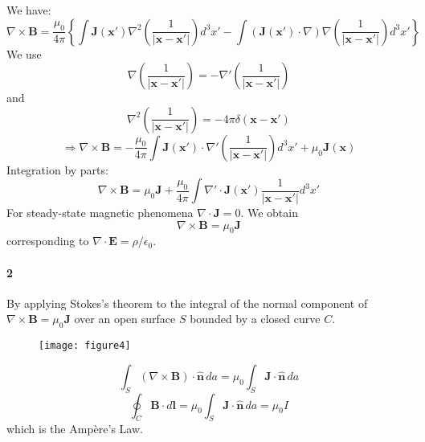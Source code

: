 \documentclass{article}
\begin{document}
	We have:
	\begin{equation*}
		\nabla \times \mathbf{B} = \frac{\mu_0}{4\pi} \left\{ \int \mathbf{J}(\mathbf{x'}) \nabla^2 \left(\frac{1}{|\mathbf{x}-\mathbf{x'}|}\right) d^3x' - \int (\mathbf{J}(\mathbf{x'}) \cdot \nabla) \nabla \left(\frac{1}{|\mathbf{x}-\mathbf{x'}|}\right) d^3x' \right\}
	\end{equation*}
	We use
	\begin{equation*}
		\nabla \left(\frac{1}{|\mathbf{x}-\mathbf{x'}|}\right) = -\nabla' \left(\frac{1}{|\mathbf{x}-\mathbf{x'}|}\right)
	\end{equation*}
	and
	\begin{equation*}
		\nabla^2 \left(\frac{1}{|\mathbf{x}-\mathbf{x'}|}\right) = -4\pi \delta(\mathbf{x}-\mathbf{x'})
	\end{equation*}
	\begin{equation*}
		\Rightarrow \nabla \times \mathbf{B} = -\frac{\mu_0}{4\pi} \int \mathbf{J}(\mathbf{x'}) \cdot \nabla' \left(\frac{1}{|\mathbf{x}-\mathbf{x'}|}\right) d^3x' + \mu_0 \mathbf{J}(\mathbf{x})
	\end{equation*}
	Integration by parts:
	\begin{equation*}
		\nabla \times \mathbf{B} = \mu_0 \mathbf{J} + \frac{\mu_0}{4\pi} \int \nabla' \cdot \mathbf{J}(\mathbf{x'}) \frac{1}{|\mathbf{x}-\mathbf{x'}|} d^3x'
	\end{equation*}
	For steady-state magnetic phenomena $\nabla \cdot \mathbf{J} = 0$. We obtain
	\begin{equation*}
		\nabla \times \mathbf{B} = \mu_0 \mathbf{J}
	\end{equation*}
	corresponding to $\nabla \cdot \mathbf{E} = \rho/\epsilon_0$.
	
	\paragraph{2}
	By applying Stokes's theorem to the integral of the normal component of $\nabla \times \mathbf{B} = \mu_0 \mathbf{J}$ over an open surface $S$ bounded by a closed curve $C$.
	
	\begin{figure}[h]
		\centering
		\texttt{[image: figure4]}
		\caption{}
		\label{fig:figure4}
	\end{figure}
	
	\begin{equation*}
		\int_S (\nabla \times \mathbf{B}) \cdot \hat{\mathbf{n}} \, da = \mu_0 \int_S \mathbf{J} \cdot \hat{\mathbf{n}} \, da
	\end{equation*}
	\begin{equation*}
		\oint_C \mathbf{B} \cdot d\mathbf{l} = \mu_0 \int_S \mathbf{J} \cdot \hat{\mathbf{n}} \, da = \mu_0 I
	\end{equation*}
	which is the Ampère's Law.
	
\end{document}
